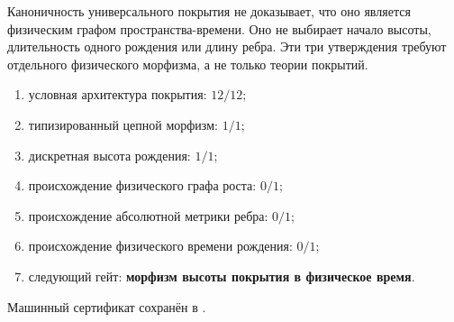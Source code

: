 \begin{nogocriterion}
Каноничность универсального покрытия не доказывает, что оно является
физическим графом пространства-времени. Оно не выбирает начало высоты,
длительность одного рождения или длину ребра. Эти три утверждения требуют
отдельного физического морфизма, а не только теории покрытий.
\end{nogocriterion}

\begin{protocol}\begin{enumerate}
\item условная архитектура покрытия: \textbf{$12/12$};
\item типизированный цепной морфизм: \textbf{$1/1$};
\item дискретная высота рождения: \textbf{$1/1$};
\item происхождение физического графа роста: \textbf{$0/1$};
\item происхождение абсолютной метрики ребра: \textbf{$0/1$};
\item происхождение физического времени рождения: \textbf{$0/1$};
\item следующий гейт: \textbf{морфизм высоты покрытия в физическое время}.
\end{enumerate}\end{protocol}

Машинный сертификат сохранён в
.